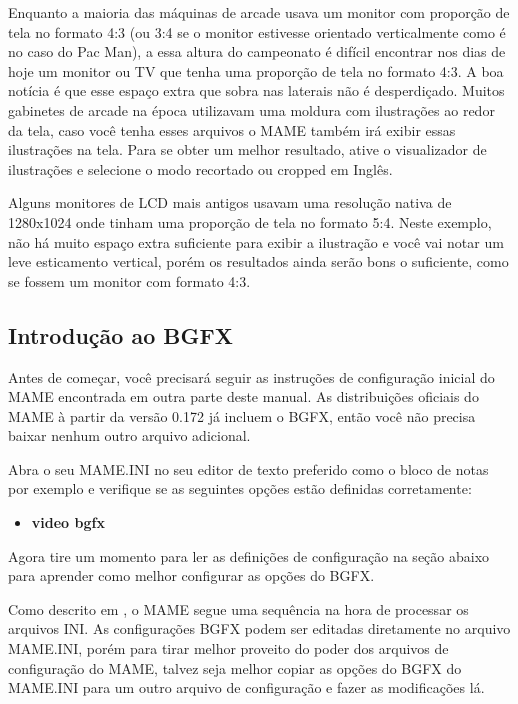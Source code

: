 \documentclass[letterpaper,10pt,brazil]{sphinxmanual}
\begin{document}
Enquanto a maioria das máquinas de arcade usava um monitor com proporção
de tela no formato 4:3 (ou 3:4 se o monitor estivesse orientado
verticalmente como é no caso do Pac Man), a essa altura do campeonato é
difícil encontrar nos dias de hoje um monitor ou TV que tenha uma
proporção de tela no formato 4:3. A boa notícia é que esse espaço extra
que sobra nas laterais não é desperdiçado. Muitos gabinetes de arcade na
época utilizavam uma moldura com ilustrações ao redor da tela, caso você
tenha esses arquivos o MAME também irá exibir essas ilustrações na tela.
Para se obter um melhor resultado, ative o visualizador de ilustrações e
selecione o modo recortado ou cropped em Inglês.

Alguns monitores de LCD mais antigos usavam uma resolução nativa de
1280x1024 onde tinham uma proporção de tela no formato 5:4.
Neste exemplo, não há muito espaço extra suficiente para exibir a
ilustração e você vai notar um leve esticamento vertical, porém os
resultados ainda serão bons o suficiente, como se fossem um monitor com
formato 4:3.


\subsection{Introdução ao BGFX}
\label{advanced/bgfx:introducao-ao-bgfx}
Antes de começar, você precisará seguir as instruções de configuração
inicial do MAME encontrada em outra parte deste manual.
As distribuições oficiais do MAME à partir da versão 0.172 já incluem o
BGFX, então você não precisa baixar nenhum outro arquivo adicional.

Abra o seu MAME.INI no seu editor de texto preferido como o bloco de
notas por exemplo e verifique se as seguintes opções estão definidas
corretamente:
\begin{itemize}
\item {} 
\textbf{video bgfx}

\end{itemize}

Agora tire um momento para ler as definições de configuração na seção
abaixo para aprender como melhor configurar as opções do BGFX.

Como descrito em {\hyperref[advanced/multiconfig:advanced\string-multi\string-cfg]{}}, o MAME segue uma sequência
na hora de processar os arquivos INI. As configurações BGFX podem ser
editadas diretamente no arquivo MAME.INI, porém para tirar melhor
proveito do poder dos arquivos de configuração do MAME, talvez seja
melhor copiar as opções do BGFX do MAME.INI para um outro arquivo de
configuração e fazer as modificações lá.
\end{document}
